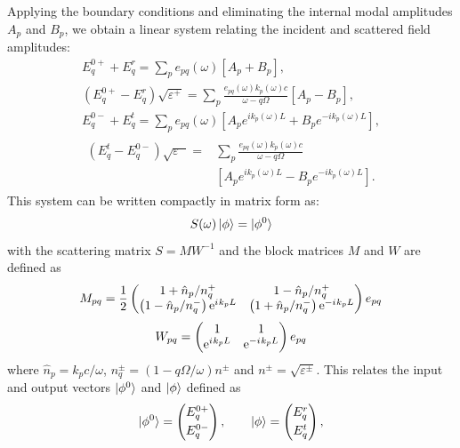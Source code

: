 \documentclass[%
 reprint,
 amsmath,amssymb,
 aps,
 prb,
]{revtex4-2}
\newcommand{\expo}[1]{{\rm e}^{#1}}
\newcommand{\iu}{{i\mkern1mu}}
\begin{document}
Applying the boundary conditions and eliminating the internal modal amplitudes $A_p$ and $B_p$, we obtain a linear system relating the incident and scattered field amplitudes:
\begin{gather}
E^{0+}_{q} + E_{q}^{r} = \sum_{p} e_{pq}(\omega) \left[A_{p} + B_{p}\right], \label{eq:linear1}\\
(E^{0+}_{q} - E_{q}^{r} )\sqrt{\varepsilon^{+}} = \sum_{p} \frac{e_{pq}(\omega) k_{p}(\omega) c}{\omega - q \Omega} \left[A_{p} - B_{p}\right], \label{eq:linear2}\\
E^{0-}_{q} + E_{q}^{t} = \sum_{p} e_{pq}(\omega) \left[A_{p} e^{ik_{p}(\omega) L} + B_{p} e^{-ik_{p}(\omega) L}\right], \label{eq:linear3}\\
\begin{split}
(E_{q}^{t} - E^{0-}_{q})\sqrt{\varepsilon^{-}} = &\sum_{p} \frac{e_{pq}(\omega) k_{p}(\omega) c}{\omega - q \Omega} \\
&\left[A_{p} e^{ik_{p}(\omega) L} - B_{p} e^{-ik_{p}(\omega) L}\right]. \label{eq:linear4}
\end{split}
\end{gather}
This system can be written compactly in matrix form as:
\begin{equation}
S(\omega)\ket{ \phi} = \ket{\phi^0}
\label{eq:slab_scatt}
\end{equation}
with the scattering matrix $S = M W^{-1}$ and the block matrices $M$ and $W$ are defined as
\begin{equation}
M_{pq} = \frac{1}{2}
    \begin{pmatrix}
    1 + \hat{n}_{p}/n_q^+   &   1 - \hat{n}_{p}/n_q^+  \\
    \left( 1 - \hat{n}_{p}/n_q^- \right) \expo{\iu k_pL} & \left(   1 + \hat{n}_{p}/n_q^- \right) \expo{-\iu k_pL}
    \end{pmatrix}e_{p q}
    \label{eq:slab_matrix1}
\end{equation}
\begin{equation}
W_{pq} =
    \begin{pmatrix}
    1   &   1  \\
     \expo{\iu k_pL} & \expo{-\iu k_pL}
    \end{pmatrix}e_{p q}
\end{equation}
where $\hat{n}_p = k_p c /\omega$, $n_q^{\pm} = (1-q\Omega/\omega) n^\pm$ and $n^\pm = \sqrt{\varepsilon^{\pm}}$.
This relates the input and output vectors $\ket{\phi^0}$ and $\ket{\phi}$ defined as
\begin{equation*}
\ket{\phi^0} =
    \begin{pmatrix}
    E^{0+}_{q} \\[0.7ex]
    E^{0-}_{q}
    \end{pmatrix}, \qquad
\ket{\phi} =
    \begin{pmatrix}
    E_{q}^r \\[0.7ex]
    E_{q}^t
    \end{pmatrix},
\end{equation*}
\end{document}
